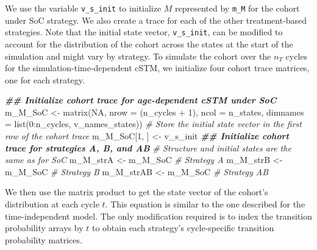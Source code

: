 \documentclass[
]{article}
\newenvironment{Shaded}{\begin{snugshade}}{\end{snugshade}}
\newcommand{\AttributeTok}[1]{\textcolor[rgb]{0.77,0.63,0.00}{#1}}
\newcommand{\CommentTok}[1]{\textcolor[rgb]{0.56,0.35,0.01}{\textit{#1}}}
\newcommand{\ConstantTok}[1]{\textcolor[rgb]{0.00,0.00,0.00}{#1}}
\newcommand{\DecValTok}[1]{\textcolor[rgb]{0.00,0.00,0.81}{#1}}
\newcommand{\DocumentationTok}[1]{\textcolor[rgb]{0.56,0.35,0.01}{\textbf{\textit{#1}}}}
\newcommand{\FunctionTok}[1]{\textcolor[rgb]{0.00,0.00,0.00}{#1}}
\newcommand{\NormalTok}[1]{#1}
\newcommand{\OtherTok}[1]{\textcolor[rgb]{0.56,0.35,0.01}{#1}}
\newcommand{\SpecialCharTok}[1]{\textcolor[rgb]{0.00,0.00,0.00}{#1}}
\begin{document}
We use the variable \texttt{v\_s\_init} to initialize \(M\) represented by \texttt{m\_M} for the cohort under SoC strategy. We also create a trace for each of the other treatment-based strategies. Note that the initial state vector, \texttt{v\_s\_init}, can be modified to account for the distribution of the cohort across the states at the start of the simulation and might vary by strategy. To simulate the cohort over the \(n_T\) cycles for the simulation-time-dependent cSTM, we initialize four cohort trace matrices, one for each strategy.

\begin{Shaded}
\begin{Highlighting}[]
\DocumentationTok{\#\# Initialize cohort trace for age{-}dependent cSTM under SoC}
\NormalTok{m\_M\_SoC }\OtherTok{\textless{}{-}} \FunctionTok{matrix}\NormalTok{(}\ConstantTok{NA}\NormalTok{, }
                 \AttributeTok{nrow =}\NormalTok{ (n\_cycles }\SpecialCharTok{+} \DecValTok{1}\NormalTok{), }\AttributeTok{ncol =}\NormalTok{ n\_states, }
                 \AttributeTok{dimnames =} \FunctionTok{list}\NormalTok{(}\DecValTok{0}\SpecialCharTok{:}\NormalTok{n\_cycles, v\_names\_states))}
\CommentTok{\# Store the initial state vector in the first row of the cohort trace}
\NormalTok{m\_M\_SoC[}\DecValTok{1}\NormalTok{, ] }\OtherTok{\textless{}{-}}\NormalTok{ v\_s\_init}
\DocumentationTok{\#\# Initialize cohort trace for strategies A, B, and AB}
\CommentTok{\# Structure and initial states are the same as for SoC}
\NormalTok{m\_M\_strA  }\OtherTok{\textless{}{-}}\NormalTok{ m\_M\_SoC }\CommentTok{\# Strategy A}
\NormalTok{m\_M\_strB  }\OtherTok{\textless{}{-}}\NormalTok{ m\_M\_SoC }\CommentTok{\# Strategy B}
\NormalTok{m\_M\_strAB }\OtherTok{\textless{}{-}}\NormalTok{ m\_M\_SoC }\CommentTok{\# Strategy AB}
\end{Highlighting}
\end{Shaded}

We then use the matrix product to get the state vector of the cohort's distribution at each cycle \(t\). This equation is similar to the one described for the time-independent model. The only modification required is to index the transition probability arrays by \(t\) to obtain each strategy's cycle-specific transition probability matrices.
\end{document}
